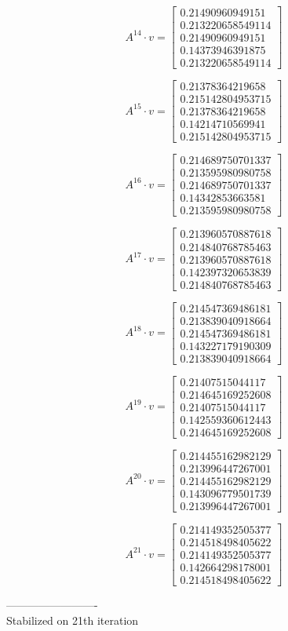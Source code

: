 \documentclass{article}
\begin{document}
$$A^{14} \cdot v = \begin{bmatrix}
0.21490960949151\\
0.213220658549114\\
0.21490960949151\\
0.14373946391875\\
0.213220658549114
\end{bmatrix}
$$

$$A^{15} \cdot v = \begin{bmatrix}
0.21378364219658\\
0.215142804953715\\
0.21378364219658\\
0.14214710569941\\
0.215142804953715
\end{bmatrix}
$$

$$A^{16} \cdot v = \begin{bmatrix}
0.214689750701337\\
0.213595980980758\\
0.214689750701337\\
0.14342853663581\\
0.213595980980758
\end{bmatrix}
$$

$$A^{17} \cdot v = \begin{bmatrix}
0.213960570887618\\
0.214840768785463\\
0.213960570887618\\
0.142397320653839\\
0.214840768785463
\end{bmatrix}
$$

$$A^{18} \cdot v = \begin{bmatrix}
0.214547369486181\\
0.213839040918664\\
0.214547369486181\\
0.143227179190309\\
0.213839040918664
\end{bmatrix}
$$

$$A^{19} \cdot v = \begin{bmatrix}
0.21407515044117\\
0.214645169252608\\
0.21407515044117\\
0.142559360612443\\
0.214645169252608
\end{bmatrix}
$$

$$A^{20} \cdot v = \begin{bmatrix}
0.214455162982129\\
0.213996447267001\\
0.214455162982129\\
0.143096779501739\\
0.213996447267001
\end{bmatrix}
$$

$$A^{21} \cdot v = \begin{bmatrix}
0.214149352505377\\
0.214518498405622\\
0.214149352505377\\
0.142664298178001\\
0.214518498405622
\end{bmatrix}
$$


-------------------------\\
Stabilized on 21th iteration
    
\end{document}
